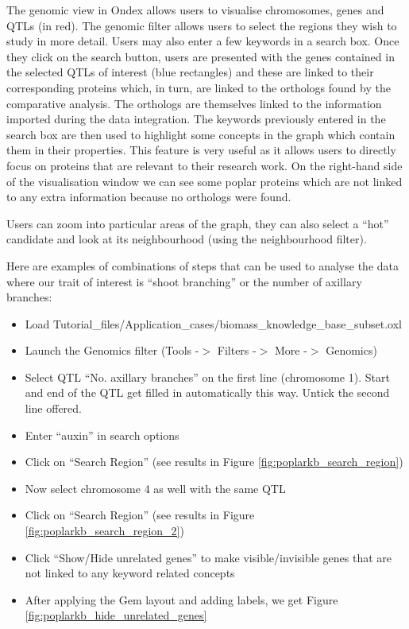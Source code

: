 The genomic view in Ondex allows users to visualise chromosomes, genes and QTLs (in red).
The genomic filter allows users to select the regions they wish to study in more detail.
Users may also enter a few keywords in a search box.
Once they click on the search button, users are presented with the genes contained in the selected QTLs of interest (blue rectangles) and
these are linked to their corresponding proteins which, in turn, are linked to the orthologs found by the comparative analysis.
The orthologs are themselves linked to the information imported during the data integration.
The keywords previously entered in the search box are then used to highlight some concepts in the graph which contain them in their properties.
This feature is very useful as it allows users to directly focus on proteins that are relevant to their research work.
On the right-hand side of the visualisation window we can see some poplar proteins which are not linked to any extra information
because no orthologs were found.

Users can zoom into particular areas of the graph, they can also select a ``hot'' candidate and look at its neighbourhood
(using the neighbourhood filter).

Here are examples of combinations of steps that can be used to analyse the data where our trait of interest is ``shoot branching'' 
or the number of axillary branches:
\begin{itemize}
\item Load Tutorial\_files/Application\_cases/biomass\_knowledge\_base\_subset.oxl
\item Launch the Genomics filter (Tools -$>$ Filters -$>$ More -$>$ Genomics)
\item Select QTL ``No. axillary branches'' on the first line (chromosome 1).
Start and end of the QTL get filled in automatically this way. Untick the second line offered. 
\item Enter ``auxin'' in search options
\item Click on ``Search Region'' (see results in Figure \ref{fig:poplarkb_search_region})
\item Now select chromosome 4 as well with the same QTL
\item Click on ``Search Region'' (see results in Figure \ref{fig:poplarkb_search_region_2})
\item Click ``Show/Hide unrelated genes'' to make visible/invisible genes that are not linked to any keyword related concepts
\item After applying the Gem layout and adding labels, we get Figure \ref{fig:poplarkb_hide_unrelated_genes}
\end{itemize}

